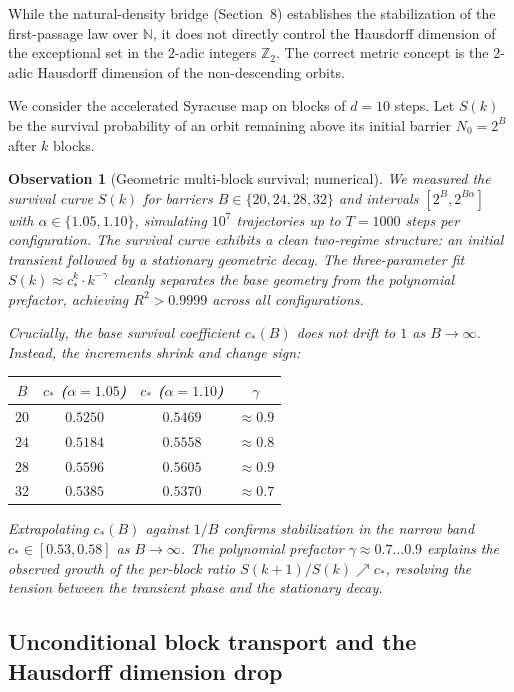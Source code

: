 \documentclass[12pt,a4paper]{article}
\newtheorem{observation}[theorem]{Observation}
\begin{document}
While the natural-density bridge (Section~8) establishes the stabilization of the first-passage law over $\mathbb{N}$, it does not directly control the Hausdorff dimension of the exceptional set in the $2$-adic integers $\mathbb{Z}_2$. The correct metric concept is the $2$-adic Hausdorff dimension of the non-descending orbits.

We consider the accelerated Syracuse map on blocks of $d=10$ steps. Let $S(k)$ be the survival probability of an orbit remaining above its initial barrier $N_0=2^B$ after $k$ blocks. 

\begin{observation}[Geometric multi-block survival; numerical]
We measured the survival curve $S(k)$ for barriers $B\in\{20, 24, 28, 32\}$ and intervals $[2^B, 2^{B\alpha}]$ with $\alpha\in\{1.05, 1.10\}$, simulating $10^7$ trajectories up to $T=1000$ steps per configuration.
The survival curve exhibits a clean two-regime structure: an initial transient followed by a stationary geometric decay. 
The three-parameter fit $S(k) \approx c_*^k \cdot k^{-\gamma}$ cleanly separates the base geometry from the polynomial prefactor, achieving $R^2 > 0.9999$ across all configurations.

Crucially, the base survival coefficient $c_*(B)$ does \emph{not} drift to $1$ as $B\to\infty$. Instead, the increments shrink and change sign:
\begin{center}
\begin{tabular}{c|ccc}
$B$ & $c_*$ ($\alpha=1.05$) & $c_*$ ($\alpha=1.10$) & $\gamma$ \\ \hline
$20$ & $0.5250$ & $0.5469$ & $\approx 0.9$ \\
$24$ & $0.5184$ & $0.5558$ & $\approx 0.8$ \\
$28$ & $0.5596$ & $0.5605$ & $\approx 0.9$ \\
$32$ & $0.5385$ & $0.5370$ & $\approx 0.7$
\end{tabular}
\end{center}
Extrapolating $c_*(B)$ against $1/B$ confirms stabilization in the narrow band $c_* \in [0.53, 0.58]$ as $B\to\infty$. The polynomial prefactor $\gamma \approx 0.7\dots 0.9$ explains the observed growth of the per-block ratio $S(k+1)/S(k) \nearrow c_*$, resolving the tension between the transient phase and the stationary decay.
\end{observation}

\subsection{Unconditional block transport and the Hausdorff dimension drop}
\label{subsec:transport_T1T3}
\end{document}
